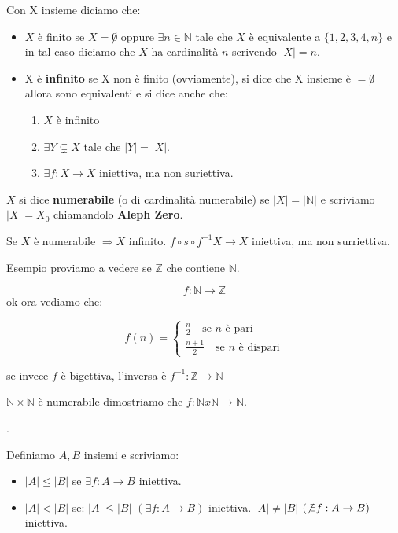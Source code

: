 \documentclass{article}
\theoremstyle{definition}
\begin{document}
Con X insieme diciamo che:
\begin{itemize}
        \item $X$ è finito se $X = \not 0$ oppure $\exists n \in \mathbb{N}$ tale che $X$ è equivalente a $\{1,2,3,4,n\}$ e in tal caso diciamo che $X$ ha cardinalità $n$ scrivendo $|X| = n$.
        \item X è \textbf{infinito} se X non è finito (ovviamente), si dice che X insieme è $= \not 0$ allora sono equivalenti e si dice anche che:
        \begin{enumerate}
                \item$X$ è infinito
                \item $\exists Y \subsetneq X$ tale che $|Y|=|X|$.
                \item $\exists f:X \to X$ iniettiva, ma non suriettiva.
        \end{enumerate}
\end{itemize}

\begin{tcolorbox}
$X$ si dice \textbf{numerabile} (o di cardinalità numerabile) se $|X| = |\mathbb{N}|$ e scriviamo $|X| = X_0$ chiamandolo \textbf{Aleph Zero}. \par
Se $X$ è numerabile $\Rightarrow X$ infinito. \newline
$f \circ s \circ f^{-1} X \rightarrow X$ iniettiva, ma non surriettiva.
\end{tcolorbox}

Esempio proviamo a vedere se $\mathbb{Z}$ che contiene $\mathbb{N}$. \par
\begin{equation}
        f : \mathbb{N} \rightarrow \mathbb{Z}
\end{equation}
ok ora vediamo che: \newline

\[
f(n) =
\begin{cases}
        \frac{n}{2} \quad \mbox{se $n$ è pari} \\
        \frac{n + 1}{2} \quad \mbox{se $n$ è dispari}
\end{cases}
\]

se invece $f$ è bigettiva, l'inversa è $f^{-1}: \mathbb{Z} \to \mathbb{N}$


$\mathbb{N} \times \mathbb{N}$ è numerabile dimostriamo che $f: \mathbb{N} x \mathbb{N} \to \mathbb{N}$.

.

Definiamo $A,B$ insiemi e scriviamo: 
\begin{itemize}
        \item $|A| \le |B|$ se $\exists f:A \to B$ iniettiva.
        \item $|A| < |B|$ se: $|A| \le |B|$ $(\exists f:A \to B)$ iniettiva. $|A| \not = |B|$ $(\not \exists f:A \to B)$ iniettiva.
\end{itemize}
\end{document}
